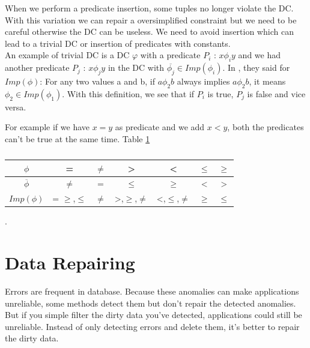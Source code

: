 \documentclass[letterpaper, 12pt]{report}
\begin{document}
When we perform a predicate insertion, some tuples no longer violate the DC. With this variation we can repair a oversimplified constraint but we need to be careful otherwise the DC can be useless. We need to avoid insertion which can lead to a trivial DC or insertion of predicates with constants. \\

An example of trivial DC is a DC $\varphi$ with a predicate $P_i$ : $x \phi_i y$ and we had another predicate $P_j$ : $x \phi_j y$ in the DC with $\overline{\phi_j} \in Imp(\phi_i)$. In \cite{main}, they said for $Imp(\phi)$: For any two values a and b, if $a \phi_2 b$ always implies $a \phi_2 b$, it means $\phi_2 \in Imp(\phi_1)$. With this definition, we see that if $P_i$ is true, $P_j$ is false and vice versa.

For example if we have $x = y$ as predicate and we add $x < y$, both the predicates can't be true at the same time. Table \ref{tableImp}

\begin{table}[H]
	\centering
	\begin{tabular}{|c|c|c|c|c|c|c|}
	\hline
	   $ \phi$ & = & $\neq$ & > & < & $\leq$& $\geq$\\
	   \hline
	   $ \overline{\phi}$ & $\neq$ & = & $\leq$ & $\geq$ & < & >\\
	   \hline
	   $Imp(\phi)$ & = $\geq$,$\leq$ & $\neq$ & >,$\geq$,$\neq$ & <,$\leq$,$\neq$ & $\geq$ & $\leq$ \\
	\hline
	 
	 \hline
	\end{tabular}
	\caption{\label{tableImp}}.
\end{table}

\chapter{Data Repairing}

Errors are frequent in database. Because these anomalies can make applications unreliable, some methods detect them but don't repair the detected anomalies. But if you simple filter the dirty data you've detected, applications could still be unreliable. \cite{anodetect} Instead of only detecting errors and delete them, it's better to repair the dirty data.\\
\end{document}
